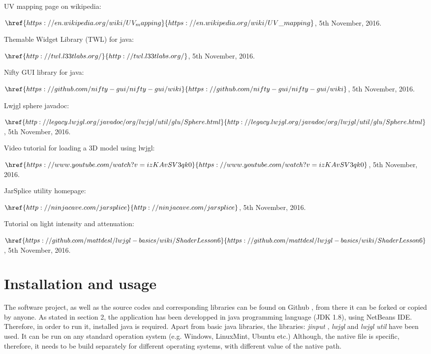 \documentclass[english,12pt,a4paper,pdftex,elec,utf8]{aaltothesis}
\begin{document}
\begin{thebibliography}{99}
 UV mapping page on wikipedia:

    $\href{https://en.wikipedia.org/wiki/UV_mapping}{https://en.wikipedia.org/wiki/UV\_mapping}$,
  5th November, 2016.

 Themable Widget Library (TWL) for java:

    $\href{http://twl.l33tlabs.org/}{http://twl.l33tlabs.org/}$,
  5th November, 2016.

 Nifty GUI library for java:

    $\href{https://github.com/nifty-gui/nifty-gui/wiki}{https://github.com/nifty-gui/nifty-gui/wiki}$,
  5th November, 2016.

 Lwjgl sphere javadoc:

    $\href{http://legacy.lwjgl.org/javadoc/org/lwjgl/util/glu/Sphere.html}{http://legacy.lwjgl.org/javadoc/org/lwjgl/util/glu/Sphere.html}$,
  5th November, 2016.

 Video tutorial for loading a 3D model using lwjgl:

    $\href{https://www.youtube.com/watch?v=izKAvSV3qk0}{https://www.youtube.com/watch?v=izKAvSV3qk0}$,
  5th November, 2016.

 JarSplice utility homepage:

    $\href{http://ninjacave.com/jarsplice}{http://ninjacave.com/jarsplice}$,
  5th November, 2016.

 Tutorial on light intensity and attenuation:

    $\href{https://github.com/mattdesl/lwjgl-basics/wiki/ShaderLesson6}{https://github.com/mattdesl/lwjgl-basics/wiki/ShaderLesson6}$,
  5th November, 2016.

\end{thebibliography}

\clearpage

\thesisappendix

\section{Installation and usage\label{LiiteA}}

The software project, as well as the source codes and corresponding libraries can be found on Github \cite{gitHub}, from there it can be forked or copied by anyone. 
As stated in section 2, the application has been developped in java programming language (JDK 1.8), using NetBeans IDE. Therefore, in order to run it, installed java is required. Apart from basic java libraries, the libraries: \textit{jinput} \cite{jinput}, \textit{lwjgl} \cite{lwjgl} and \textit{lwjgl util} \cite{lwjglUtil} have been used. It can be run on any standard operation system (e.g. Windows, LinuxMint, Ubuntu etc.) Although, the native file is specific, therefore, it needs to be build separately for different operating systems, with different value of the native path.
\end{document}
